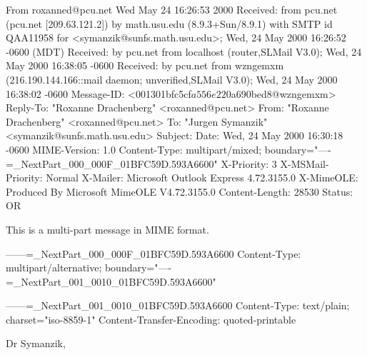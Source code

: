 From roxanned@pcu.net Wed May 24 16:26:53 2000
Received: from pcu.net (pcu.net [209.63.121.2])
	by math.usu.edu (8.9.3+Sun/8.9.1) with SMTP id QAA11958
	for <symanzik@sunfs.math.usu.edu>; Wed, 24 May 2000 16:26:52 -0600 (MDT)
Received: by pcu.net from localhost
    (router,SLMail V3.0); Wed, 24 May 2000 16:38:05 -0600
Received: by pcu.net from wzngemxm
    (216.190.144.166::mail daemon; unverified,SLMail V3.0); Wed, 24 May 2000 16:38:02 -0600
Message-ID: <001301bfc5cf$a556e220$a690bed8@wzngemxm>
Reply-To: "Roxanne Drachenberg" <roxanned@pcu.net>
From: "Roxanne Drachenberg" <roxanned@pcu.net>
To: "Jurgen Symanzik" <symanzik@sunfs.math.usu.edu>
Subject: 
Date: Wed, 24 May 2000 16:30:18 -0600
MIME-Version: 1.0
Content-Type: multipart/mixed;
	boundary="----=_NextPart_000_000F_01BFC59D.593A6600"
X-Priority: 3
X-MSMail-Priority: Normal
X-Mailer: Microsoft Outlook Express 4.72.3155.0
X-MimeOLE: Produced By Microsoft MimeOLE V4.72.3155.0
Content-Length: 28530
Status: OR

This is a multi-part message in MIME format.

------=_NextPart_000_000F_01BFC59D.593A6600
Content-Type: multipart/alternative;
	boundary="----=_NextPart_001_0010_01BFC59D.593A6600"


------=_NextPart_001_0010_01BFC59D.593A6600
Content-Type: text/plain;
	charset="iso-8859-1"
Content-Transfer-Encoding: quoted-printable

Dr Symanzik,

